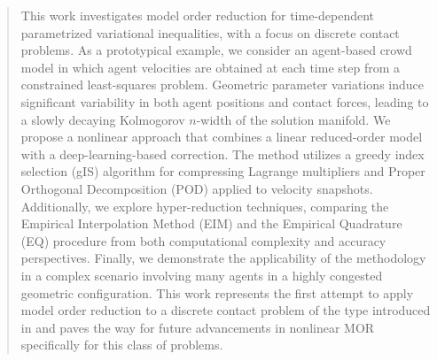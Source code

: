 \begin{abstract}
This work investigates model order reduction for time-dependent parametrized variational inequalities, with a focus on discrete contact problems. As a prototypical example, we consider an agent-based crowd model \cite{maury2011discrete} in which agent velocities are obtained at each time step from a constrained least-squares problem. Geometric parameter variations induce significant variability in both agent positions and contact forces, leading to a slowly decaying Kolmogorov $n$-width of the solution manifold. We propose a nonlinear approach that combines a linear reduced-order model with a deep-learning-based correction. The method utilizes a greedy index selection (gIS) algorithm for compressing Lagrange multipliers and Proper Orthogonal Decomposition (POD) applied to velocity snapshots. Additionally, we explore hyper-reduction techniques, comparing the Empirical Interpolation Method (EIM) and the Empirical Quadrature (EQ) procedure from both computational complexity and accuracy perspectives.
Finally, we demonstrate the applicability of the methodology in a complex scenario involving many agents in a highly congested geometric configuration. This work represents the first attempt to apply model order reduction to a discrete contact problem of the type introduced in
 \cite{maury2011discrete} and paves the way for future advancements in nonlinear MOR specifically for this class of problems.


\end{abstract}

